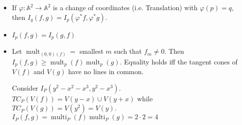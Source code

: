 \documentclass{report}
\begin{document}
\begin{itemize}
        \item If $\varphi: \mathbb{A}^{2} \rightarrow \mathbb{A}^{2}$ is a change of coordinates (i.e. Translation) with $\varphi(p) = q$, then $I_{q}(f, g) = I_{p}(\varphi^{*}f, \varphi^{*}g)$.

        \item $I_{p}(f, g) = I_{p}(g, f)$

        \item Let $\mathop{mult}_{(0, 0)(f)} = $ smallest $m$ such that $f_{m} \neq 0$. Then $I_{p}(f, g) \geq \mathop{mult}_{p}(f)\mathop{mult}_{p}(g)$. Equality holds iff the tangent cones of $V(f)$ and $V(g)$ have no lines in common.
            \begin{examples}
                \begin{example}
                    Consider $I_{P}(y^{2} - x^{2} - x^{3} , y^{2} - x^{3})$. $TC_{P}(V(f)) = V(y - x) \cup V(y + x)$ while $TC_{P}(V(g)) = V(y^{2}) = V(y)$. $I_{P}(f, g) = \mathop{multi}_{P}(f) \mathop{multi}_{P}(g) = 2 \cdot 2 = 4$
                \end{example}
            \end{examples}


\end{itemize}
\end{document}
